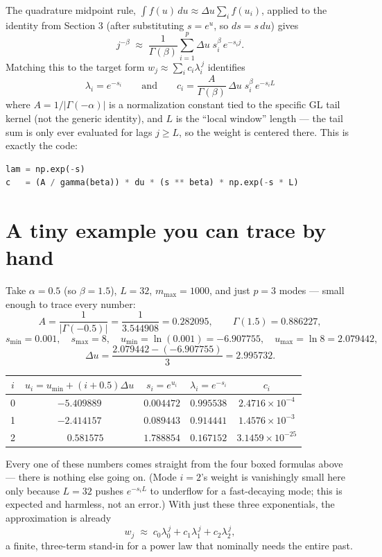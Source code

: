\documentclass[11pt]{article}
\begin{document}
The quadrature midpoint rule, $\int f(u)\,du \approx \Delta u\sum_i f(u_i)$, applied to the identity from Section 3 (after substituting $s=e^u$, so $ds = s\,du$) gives
\[
j^{-\beta} \;\approx\; \frac{1}{\Gamma(\beta)}\sum_{i=1}^p \Delta u\; s_i^{\beta}\, e^{-s_i j}.
\]
Matching this to the target form $w_j \approx \sum_i c_i \lambda_i^{\,j}$ identifies
\[
\boxed{\lambda_i = e^{-s_i}} \qquad\text{and}\qquad \boxed{c_i = \frac{A}{\Gamma(\beta)}\,\Delta u\; s_i^{\beta}\, e^{-s_i L}}
\]
where $A = 1/|\Gamma(-\alpha)|$ is a normalization constant tied to the specific GL tail kernel (not the generic identity), and $L$ is the ``local window'' length --- the tail sum is only ever evaluated for lags $j\ge L$, so the weight is centered there. This is exactly the code:
\begin{lstlisting}[language=Python]
lam = np.exp(-s)
c   = (A / gamma(beta)) * du * (s ** beta) * np.exp(-s * L)
\end{lstlisting}

\section{A tiny example you can trace by hand}

Take $\alpha=0.5$ (so $\beta=1.5$), $L=32$, $m_{\max}=1000$, and just $p=3$ modes --- small enough to trace every number:
\[
A = \frac{1}{|\Gamma(-0.5)|} = \frac{1}{3.544908} = 0.282095,
\qquad \Gamma(1.5) = 0.886227,
\]
\[
s_{\min}=0.001,\quad s_{\max}=8,\quad u_{\min}=\ln(0.001)=-6.907755,\quad u_{\max}=\ln 8=2.079442,
\]
\[
\Delta u = \frac{2.079442 - (-6.907755)}{3} = 2.995732.
\]

\begin{table}[h]
\centering
\small
\begin{tabular}{c c c c c}
\toprule
$i$ & $u_i = u_{\min}+(i+0.5)\Delta u$ & $s_i=e^{u_i}$ & $\lambda_i = e^{-s_i}$ & $c_i$ \\
\midrule
0 & $-5.409889$ & $0.004472$ & $0.995538$ & $2.4716\times10^{-4}$ \\
1 & $-2.414157$ & $0.089443$ & $0.914441$ & $1.4576\times10^{-3}$ \\
2 & $\phantom{-}0.581575$ & $1.788854$ & $0.167152$ & $3.1459\times10^{-25}$ \\
\bottomrule
\end{tabular}
\end{table}

Every one of these numbers comes straight from the four boxed formulas above --- there is nothing else going on. (Mode $i=2$'s weight is vanishingly small here only because $L=32$ pushes $e^{-s_i L}$ to underflow for a fast-decaying mode; this is expected and harmless, not an error.) With just these three exponentials, the approximation is already
\[
w_j \;\approx\; c_0\lambda_0^{\,j} + c_1\lambda_1^{\,j} + c_2\lambda_2^{\,j},
\]
a finite, three-term stand-in for a power law that nominally needs the entire past.
\end{document}
